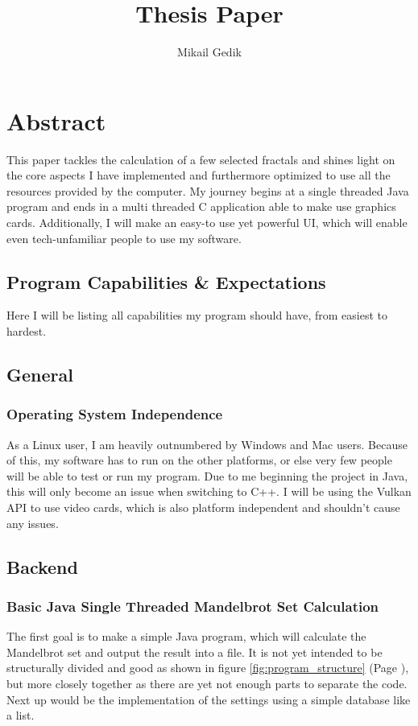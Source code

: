 \documentclass[10pt,a4paper,titlepage]{article}
\author{Mikail Gedik}
\title{Thesis Paper}
\begin{document}
	\maketitle
	\tableofcontents
	\listoffigures
	\clearpage
	\section{Abstract}
	This paper tackles the calculation of a few selected fractals and shines light on the core aspects I have implemented and furthermore optimized to use all the resources provided by the computer. My journey begins at a single threaded Java program and ends in a multi threaded C application able to make use graphics cards. Additionally, I will make an easy-to use yet powerful UI, which will enable even tech-unfamiliar people to use my software.
	\subsection{Program Capabilities \& Expectations}
	Here I will be listing all capabilities my program should have, from easiest to hardest.
	\subsection{General}
	\subsubsection{Operating System Independence}
	As a Linux user, I am heavily outnumbered by Windows and Mac users. Because of this, my software has to run on the other platforms, or else very few people will be able to test or run my program. Due to me beginning the project in Java, this will only become an issue when switching to C++. I will be using the Vulkan API to use video cards, which is also platform independent and shouldn't cause any issues.
	\subsection{Backend}
	\subsubsection{Basic Java Single Threaded Mandelbrot Set Calculation}
	The first goal is to make a simple Java program, which will calculate the Mandelbrot set and output the result into a file. It is not yet intended to be structurally divided and good as shown in figure \ref{fig:program_structure} (Page \pageref{fig:program_structure}), but more closely together as there are yet not enough parts to separate the code.\\
	Next up would be the implementation of the settings using a simple database like a list.
\end{document}
